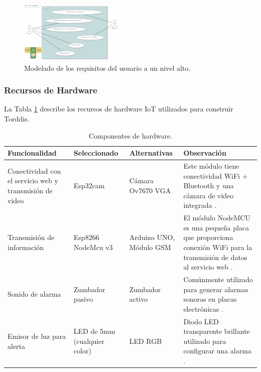 \begin{figure}[h]
\centering
\includegraphics[frame,scale=0.5, width=\linewidth]{figs/Figure_2}
\caption{Modelado de los requisitos del usuario a un nivel alto.\label{fig:UseCaseDiagram}}
\end{figure} 

\subsubsection*{Recursos de Hardware}
La Tabla \ref{table:hardware-components} describe los recursos de hardware IoT utilizados para construir Torddis. 

\begin{table}[htb]
\caption{Componentes de hardware.}
\label{table:hardware-components}
\centering
\begin{tabular}{p{}p{}p{}p{}}
	\hline
	\multicolumn{1}{l}{\textbf{Funcionalidad}} & \multicolumn{1}{l}{\textbf{Seleccionado}} & \multicolumn{1}{l}{\textbf{Alternativas}} & \multicolumn{1}{l}{\textbf{Observación}} \\ \hline
	Conectividad con el servicio web y transmisión de video & Esp32cam & Cámara Ov7670 VGA & Este módulo tiene conectividad WiFi + Bluetooth y una cámara de video integrada \citep{CasasSanchez2022}. \\
	Transmisión de información & Esp8266 NodeMcu v3 & Arduino UNO, Módulo GSM & El módulo NodeMCU es una pequeña placa que proporciona conexión WiFi para la transmisión de datos al servicio web \citep{Barai2019}. \\
	Sonido de alarma & Zumbador pasivo & Zumbador activo & Comúnmente utilizado para generar alarmas sonoras en placas electrónicas \citep{Adebisi2023development}. \\
	Emisor de luz para alerta & LED de 5mm (cualquier color) & LED RGB & Diodo LED transparente brillante utilizado para configurar una alarma \citep{Upender2020}.  \\ \hline
\end{tabular}
\end{table}

